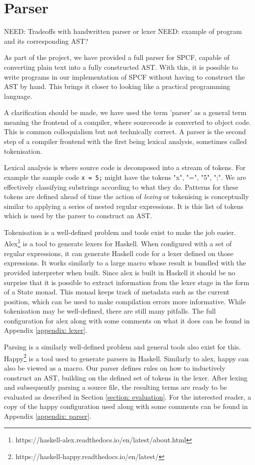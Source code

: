 \documentclass[12pt,a4paper]{report}
\theoremstyle{definition}
\theoremstyle{remark}
\begin{document}
\section{Parser}
NEED: Tradeoffs with handwritten parser or lexer
NEED: example of program and its corresponding AST?


As part of the project, we have provided a full parser for SPCF, capable of converting plain text into a fully constructed AST. With this, it is possible to write programs in our implementation of SPCF without having to construct the AST by hand. This brings it closer to looking like a practical programming language. 

A clarification should be made, we have used the term 'parser' as a general term meaning the frontend of a compiler, where sourcecode is converted to object code. This is common colloquialism but not technically correct. A parser is the second step of a compiler frontend with the first being lexical analysis, sometimes called tokenisation.

Lexical analysis is where source code is decomposed into a stream of tokens. For example the sample code \lstinline{x = 5;} might have the tokens "x", "=", "5", ";". We are effectively classifying substrings according to what they do. Patterns for these tokens are defined ahead of time the action of \emph{lexing} or tokenising is conceptually similar to applying a series of nested regular expressions. It is this list of tokens which is used by the parser to construct an AST.

Tokenisation is a well-defined problem and tools exist to make the job easier. Alex\footnote{https://haskell-alex.readthedocs.io/en/latest/about.html} is a tool to generate lexers for Haskell. When configured with a set of regular expressions, it can generate Haskell code for a lexer defined on those expressions. It works similarly to a large macro whose result is bundled with the provided interpreter when built. Since alex is built in Haskell it should be no surprise that it is possible to extract information from the lexer stage in the form of a State monad. This monad keeps track of metadata such as the current position, which can be used to make compilation errors more informative. While tokenisation may be well-defined, there are still many pitfalls. The full configuration for alex along with some comments on what it does can be found in Appendix \ref{appendix: lexer}.

Parsing is a similarly well-defined problem and general tools also exist for this. Happy\footnote{https://haskell-happy.readthedocs.io/en/latest/} is a tool used to generate parsers in Haskell. Similarly to alex, happy can also be viewed as a macro. Our parser defines rules on how to inductively construct an AST, building on the defined set of tokens in the lexer. After lexing and subsequently parsing a source file, the resulting terms are ready to be evaluated as described in Section \ref{section: evaluation}. For the interested reader, a copy of the happy configuration used along with some comments can be found in Appendix \ref{appendix: parser}.
\end{document}
